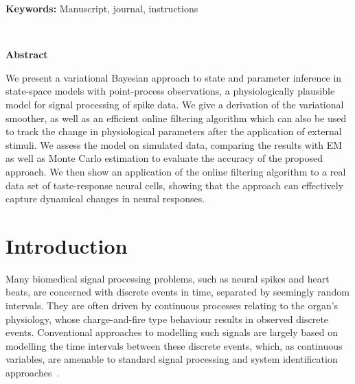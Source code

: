 \documentclass[12pt]{article}
\begin{document}
{\bf Keywords:} Manuscript, journal, instructions

\thispagestyle{empty}
%
\ \vspace{-0mm}\\
%
\begin{center} {\bf Abstract}


We present a variational Bayesian approach to state and parameter inference in
	state-space models with point-process observations, a physiologically plausible model for
	signal processing of spike data. We give a derivation of the variational smoother, as well
	as an efficient online filtering algorithm which can also be used to track the change in
	physiological parameters after the application of external stimuli. We assess the model on
	simulated data, comparing the results with EM as well as Monte Carlo estimation to evaluate
	the accuracy of the proposed approach. We then show an application of the online filtering
	algorithm to a real data set of taste-response neural cells, showing that the approach can
	effectively capture dynamical changes in neural responses.   \end{center}


\section{Introduction}

Many biomedical signal processing problems, such as neural spikes and  heart beats, are concerned
with discrete events in time, separated by seemingly random intervals.  They are often driven by
continuous processes relating to the organ's physiology, whose charge-and-fire  type behaviour
results in observed discrete  events. Conventional approaches to  modelling such signals are largely
based on modelling the time intervals between these discrete events, which, as continuous variables,
are amenable to standard signal processing and system identification
approaches~\cite{Ivanov_1996,Jolivet_2008}.
\end{document}
